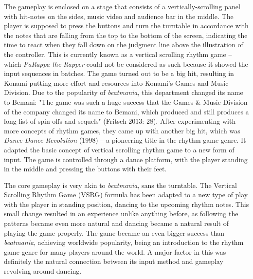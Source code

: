 The gameplay is enclosed on a stage that consists of a vertically-scrolling panel with hit-notes on the sides, music video and audience bar in the middle. The player is supposed to press the buttons and turn the turntable in accordance with the notes that are falling from the top to the bottom of the screen, indicating the time to react when they fall down on the judgment line above the illustration of the controller. This is currently known as a vertical scrolling rhythm game -- which \textit{PaRappa the Rapper} could not be considered as such because it showed the input sequences in batches. The game turned out to be a big hit, resulting in Konami putting more effort and resources into Konami's Games and Music Division. Due to the popularity of \textit{beatmania}, this department changed its name to Bemani: "The game was such a huge success that the Games \& Music Division
of the company changed its name to Bemani, which produced and still produces a
long list of spin-offs and sequels" (Fritsch 2013: 28). \cite{MusicMedien} After experimenting with more concepts of rhythm games, they came up with another big hit, which was \textit{Dance Dance Revolution} (1998) -- a pioneering title in the rhythm game genre. It adapted the basic concept of vertical scrolling rhythm game to a new form of input. The game is controlled through a dance platform, with the player standing in the middle and pressing the buttons with their feet.

The core gameplay is very akin to \textit{beatmania}, sans the turntable. The Vertical Scrolling Rhythm Game (VSRG) formula has been adapted to a new type of play with the player in standing position, dancing to the upcoming rhythm notes. This small change resulted in an experience unlike anything before, as following the patterns became even more natural and dancing became a natural result of playing the game properly. The game became an even bigger success than \textit{beatmania}, achieving worldwide popularity, being an introduction to the rhythm game genre for many players around the world. A major factor in this was definitely the natural connection between its input method and gameplay revolving around dancing.

